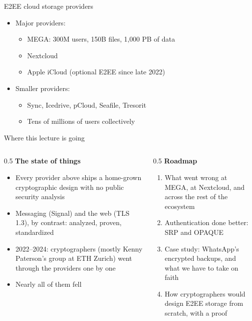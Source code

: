 \ifdefined\PRESENTATION\else\PassOptionsToClass{handout}{beamer}\fi\documentclass[aspectratio=169, lualatex]{beamer}
\begin{document}
\begin{frame}{E2EE cloud storage providers}
	\begin{itemize}
		\item Major providers:
		      \begin{itemize}
			      \item MEGA: 300M users, 150B files, 1,000 PB of data
			      \item Nextcloud
			      \item Apple iCloud (optional E2EE since late 2022)
		      \end{itemize}
		\item Smaller providers:
		      \begin{itemize}
			      \item Sync, Icedrive, pCloud, Seafile, Tresorit
			      \item Tens of millions of users collectively
		      \end{itemize}
	\end{itemize}
\end{frame}

\begin{frame}{Where this lecture is going}
	\begin{columns}[c]
		\begin{column}{0.5\textwidth}
			\textbf{The state of things}
			\begin{itemize}
				\item Every provider above ships a home-grown cryptographic design with no public security analysis
				\item Messaging (Signal) and the web (TLS 1.3), by contrast: analyzed, proven, standardized
				\item 2022--2024: cryptographers (mostly Kenny Paterson's group at ETH Zurich) went through the providers one by one
				\item Nearly all of them fell
			\end{itemize}
		\end{column}
		\begin{column}{0.5\textwidth}
			\textbf{Roadmap}
			\begin{enumerate}
				\item What went wrong at MEGA, at Nextcloud, and across the rest of the ecosystem
				\item Authentication done better: SRP and OPAQUE
				\item Case study: WhatsApp's encrypted backups, and what we have to take on faith
				\item How cryptographers would design E2EE storage from scratch, with a proof
			\end{enumerate}
		\end{column}
	\end{columns}
\end{frame}
\end{document}
